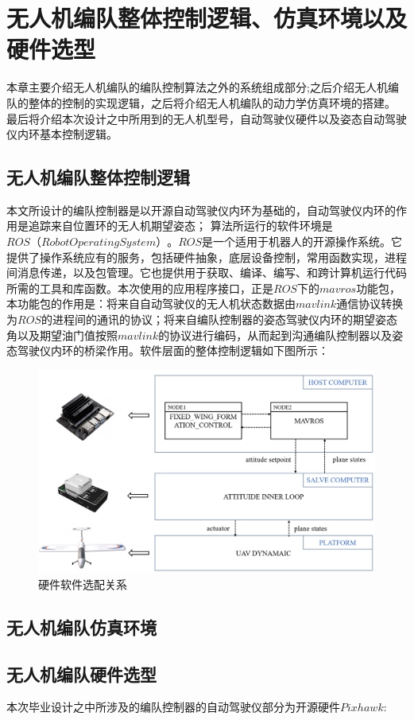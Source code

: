 \chapter{无人机编队整体控制逻辑、仿真环境以及硬件选型}
\label{chap:hardware}
本章主要介绍无人机编队的编队控制算法之外的系统组成部分;之后介绍无人机编队的整体的控制的实现逻辑，之后将介绍无人机编队的动力学仿真环境的搭建。
最后将介绍本次设计之中所用到的无人机型号，自动驾驶仪硬件以及姿态自动驾驶仪内环基本控制逻辑。
\section{无人机编队整体控制逻辑}
本文所设计的编队控制器是以开源自动驾驶仪内环为基础的，自动驾驶仪内环的作用是追踪来自位置环的无人机期望姿态；
算法所运行的软件环境是$ROS（Robot Operating System）$。$ROS$是一个适用于机器人的开源操作系统。它提供了操作系统应有的服务，包括硬件抽象，底层设备控制，常用函数实现，进程间消息传递，以及包管理。它也提供用于获取、编译、编写、和跨计算机运行代码所需的工具和库函数。本次使用的应用程序接口，正是$ROS$下的$mavros$功能包，本功能包的作用是：将来自自动驾驶仪的无人机状态数据由$mavlink$通信协议转换为$ROS$的进程间的通讯的协议；将来自编队控制器的姿态驾驶仪内环的期望姿态角以及期望油门值按照$mavlink$的协议进行编码，从而起到沟通编队控制器以及姿态驾驶仪内环的桥梁作用。软件层面的整体控制逻辑如下图所示：
\begin{figure}[H]
    \centering
    \includegraphics[width=1\textwidth]{figures/c4/c4-soft-hard.png}
    \caption{硬件软件选配关系}\label{fig:c4-soft-hard.png}
\end{figure}

\section{无人机编队仿真环境}
\section{无人机编队硬件选型}
本次毕业设计之中所涉及的编队控制器的自动驾驶仪部分为开源硬件$Pixhawk$:
